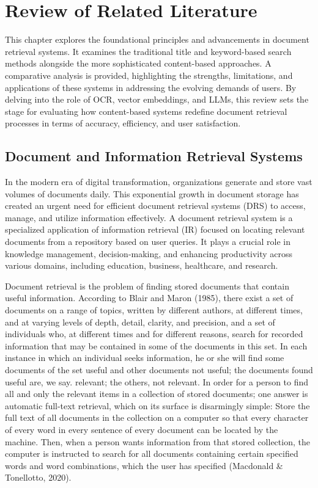 \chapter{Review of Related Literature}\label{ch:rrl}

This chapter explores the foundational principles and advancements in document retrieval systems. It examines the traditional title and keyword-based search methods alongside the more sophisticated content-based approaches. A comparative analysis is provided, highlighting the strengths, limitations, and applications of these systems in addressing the evolving demands of users. By delving into the role of OCR, vector embeddings, and LLMs, this review sets the stage for evaluating how content-based systems redefine document retrieval processes in terms of accuracy, efficiency, and user satisfaction.

\section{Document and Information Retrieval Systems}

In the modern era of digital transformation, organizations generate and store vast volumes of documents daily. This exponential growth in document storage has created an urgent need for efficient document retrieval systems (DRS) to access, manage, and utilize information effectively. A document retrieval system is a specialized application of information retrieval (IR) focused on locating relevant documents from a repository based on user queries. It plays a crucial role in knowledge management, decision-making, and enhancing productivity across various domains, including education, business, healthcare, and research.

Document retrieval is the problem of finding stored documents that contain useful information. According to Blair and Maron (1985), there exist a set of documents on a range of topics, written by different authors, at different times, and at varying levels of depth, detail, clarity, and precision, and a set of individuals who, at different times and for different reasons, search for recorded information that may be contained in some of the documents in this set. In each instance in which an individual seeks information, he or she will find some documents of the set useful and other documents not useful; the documents found useful are, we say. relevant; the others, not relevant. In order for a person to find all and only the relevant items in a collection of stored documents; one answer is automatic full-text retrieval, which on its surface is disarmingly simple: Store the full text of all documents in the collection on a computer so that every character of every word in every sentence of every document can be located by the machine. Then, when a person wants information from that stored collection, the computer is instructed to search for all documents containing certain specified words and word combinations, which the user has specified (Macdonald \& Tonellotto, 2020).

